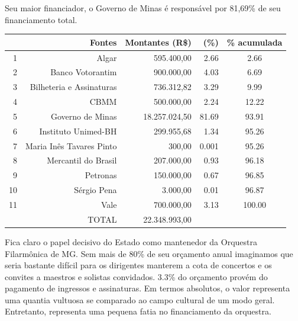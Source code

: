 \documentclass[a4paper, 12pt, openright, oneside, german, french, english, brazil]{abntex2}
\begin{document}
	Seu maior financiador, o Governo de Minas é responsável por 81,69\% de seu financiamento total. 
	
	\begin{table}[ht]
		{\begin{tabular}{rrrrc}
				\hline
				& Fontes & Montantes (R\$) & (\%) & \% acumulada \\ 
				\hline
				1 & Algar & 595.400,00 & 2.66 & 2.66 \\ 
				2 & Banco Votorantim & 900.000,00 & 4.03 & 6.69 \\ 
				3 & Bilheteria e Assinaturas & 736.312,82 & 3.29 & 9.99 \\ 
				4 & CBMM & 500.000,00 & 2.24 & 12.22 \\ 
				5 & Governo de Minas & 18.257.024,50 & 81.69 & 93.91 \\ 
				6 & Instituto Unimed-BH & 299.955,68 & 1.34 & 95.26 \\ 
				7 & Maria Inês Tavares Pinto & 300,00 & 0.001 & 95.26 \\ 
				8 & Mercantil do Brasil & 207.000,00 & 0.93 & 96.18 \\ 
				9 & Petronas & 150.000,00 & 0.67 & 96.85 \\ 
				10 & Sérgio Pena & 3.000,00 & 0.01 & 96.87 \\ 
				11 & Vale & 700.000,00 & 3.13 & 100.00 \\ 
				\hline
				& TOTAL & 22.348.993,00 &  & \\
				\hline 
			\end{tabular}
		}
		{
		}
	\end{table}
	
	Fica claro o papel decisivo do Estado como mantenedor da Orquestra Filarmônica de MG. Sem mais de 80\% de seu orçamento anual imaginamos que seria bastante difícil para os dirigentes manterem a cota de concertos e os convites a maestros e solistas convidados. 3.3\% do orçamento provém do pagamento de ingressos e assinaturas. Em termos absolutos, o valor representa uma quantia vultuosa se comparado ao campo cultural de um modo geral. Entretanto, representa uma pequena fatia no financiamento da orquestra.
	
\end{document}
